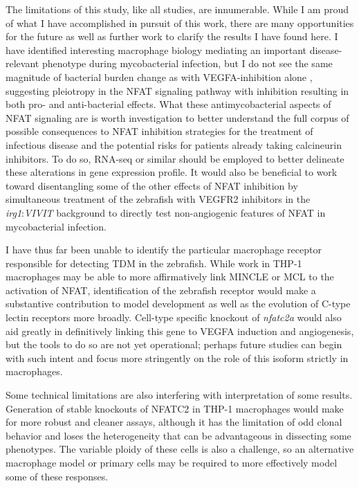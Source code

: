 The limitations of this study, like all studies, are innumerable. While I am proud of what I have accomplished in pursuit of this work, there are many opportunities for the future as well as further work to clarify the results I have found here. I have identified interesting macrophage biology mediating an important disease\hyp{}relevant phenotype during mycobacterial infection, but I do not see the same magnitude of bacterial burden change as with VEGFA\hyp{}inhibition alone \citep{Oehlers2015}, suggesting pleiotropy in the NFAT signaling pathway with inhibition resulting in both pro\hyp{} and anti\hyp{}bacterial effects. What these antimycobacterial aspects of NFAT signaling are is worth investigation to better understand the full corpus of possible consequences to NFAT inhibition strategies for the treatment of infectious disease and the potential risks for patients already taking calcineurin inhibitors. To do so, RNA\hyp{}seq or similar should be employed to better delineate these alterations in gene expression profile. It would also be beneficial to work toward disentangling some of the other effects of NFAT inhibition by simultaneous treatment of the zebrafish with VEGFR2 inhibitors in the \textit{irg1}:\textit{VIVIT} background to directly test non\hyp{}angiogenic features of NFAT in mycobacterial infection.

I have thus far been unable to identify the particular macrophage receptor responsible for detecting TDM in the zebrafish. While work in THP\hyp{}1 macrophages may be able to more affirmatively link MINCLE or MCL to the activation of NFAT, identification of the zebrafish receptor would make a substantive contribution to model development as well as the evolution of C\hyp{}type lectin receptors more broadly. Cell\hyp{}type specific knockout of \textit{nfatc2a} would also aid greatly in definitively linking this gene to VEGFA induction and angiogenesis, but the tools to do so are not yet operational; perhaps future studies can begin with such intent and focus more stringently on the role of this isoform strictly in macrophages.

Some technical limitations are also interfering with interpretation of some results. Generation of stable knockouts of NFATC2 in THP\hyp{}1 macrophages would make for more robust and cleaner assays, although it has the limitation of odd clonal behavior and loses the heterogeneity that can be advantageous in dissecting some phenotypes. The variable ploidy of these cells is also a challenge, so an alternative macrophage model or primary cells may be required to more effectively model some of these responses.

